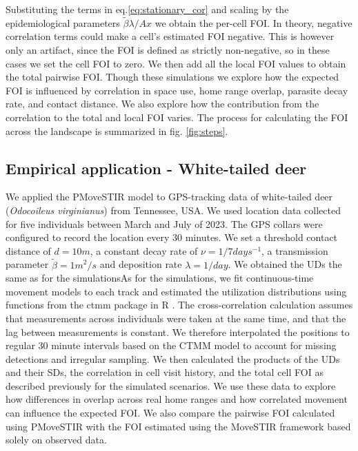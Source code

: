 \documentclass[letterpaper]{article}
\begin{document}
Substituting the terms in eq.\ref{eq:stationary_cor} and scaling by the epidemiological parameters $\tilde\beta\lambda/ Ax$ we obtain the per-cell FOI. 
In theory, negative correlation terms could make a cell's estimated FOI negative. This is however only an artifact, since the FOI is defined as strictly non-negative, so in these cases we set the cell FOI to zero.
We then add all the local FOI values to obtain the total pairwise FOI.
Though these simulations we explore how the expected FOI is influenced by correlation in space use, home range overlap, parasite decay rate, and contact distance. We also explore how the contribution from the correlation to the total and local FOI varies. The process for calculating the FOI across the landscape is summarized in fig. \ref{fig:steps}.

\subsection*{Empirical application - White-tailed deer}

We applied the PMoveSTIR model to GPS-tracking data of white-tailed deer (\emph{Odocoileus virginianus}) from Tennessee, USA.
We used location data collected for five individuals between March and July of 2023. The GPS collars were configured to record the location every 30 minutes.
We set a threshold contact distance of $d=10 m$, a constant decay rate of $\nu=1/7 days^{-1}$, a transmission parameter $\tilde\beta=1 m^2/s$ and deposition rate $\lambda=1/day$.
We obtained the UDs the same as for the simulationsAs for the simulations, we fit continuous-time movement models to each track and estimated the utilization distributions using functions from the ctmm package in R \citep{Calabrese2016}. The cross-correlation calculation assumes that measurements across individuals were taken at the same time, and that the lag between measurements is constant. We therefore interpolated the positions to regular 30 minute intervals based on the CTMM model to account for missing detections and irregular sampling. 
We then calculated the products of the UDs and their SDs, the correlation in cell visit history, and the total cell FOI as described previously for the simulated scenarios. 
We use these data to explore how differences in overlap across real home ranges and how correlated movement can influence the expected FOI. 
We also compare the pairwise FOI calculated using PMoveSTIR with the FOI estimated using the MoveSTIR framework based solely on observed data. 
\end{document}
